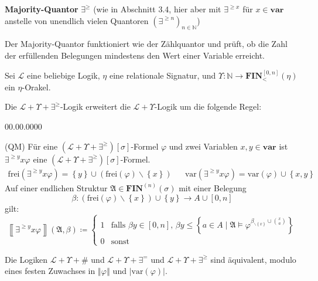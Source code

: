 %
\begin{defn}
\textbf{Majority-Quantor }$\exists^{\geqslant}$ (wie in \cite{EbbinghausFlum}
Abschnitt 3.4, hier aber mit $\exists^{\geqslant x}$ für $x\in\mathbf{var}$
anstelle von unendlich vielen Quantoren $\left(\exists^{\geqslant n}\right)_{n\in\mathbb{N}}$)

Der Majority-Quantor funktioniert wie der Zählquantor und prüft, ob
die Zahl der erfüllenden Belegungen mindestens den Wert einer Variable
erreicht.

Sei $\mathcal{L}$ eine beliebige Logik, $\eta$ eine relationale
Signatur, und $\Upsilon:\mathbb{N}\rightarrow\mathbf{FIN}_{<}^{\left[0,n\right]}\left(\eta\right)$
ein $\eta$-Orakel.

Die $\mathcal{L}+\Upsilon+\exists^{\geqslant}$-Logik erweitert die
$\mathcal{L}+\Upsilon$-Logik um die folgende Regel:

\begin{labeling}{00.00.0000}
\item [{(QM)}] Für eine $\left(\mathcal{L}+\Upsilon+\exists^{\geqslant}\right)\left[\sigma\right]$-Formel
$\varphi$ und zwei Variablen $x,y\in\mathbf{var}$ ist $\exists^{\geqslant y}x\varphi$
eine $\left(\mathcal{L}+\Upsilon+\exists^{\geqslant}\right)\left[\sigma\right]$-Formel.
\begin{eqnarray*}
\mathrm{frei}\left(\exists^{\geqslant y}x\varphi\right)=\left\{ y\right\} \cup\left(\mathrm{frei}\left(\varphi\right)\backslash\left\{ x\right\} \right) &  & \mathrm{var}\left(\exists^{\geqslant y}x\varphi\right)=\mathrm{var}\left(\varphi\right)\cup\left\{ x,y\right\} 
\end{eqnarray*}
Auf einer endlichen Struktur $\mathfrak{A}\in\mathbf{FIN}^{\left(n\right)}\left(\sigma\right)$
mit einer Belegung 
\[
\beta:\left(\mathrm{frei}\left(\varphi\right)\backslash\left\{ x\right\} \right)\cup\left\{ y\right\} \rightarrow A\cup\left[0,n\right]
\]
 gilt: 
\[
\left\llbracket \exists^{\geqslant y}x\varphi\right\rrbracket \left(\mathfrak{A},\beta\right)\coloneqq\begin{cases}
1 & \mathrm{falls}\,\,\beta y\in\left[0,n\right],\,\beta y\leqslant\left\{ a\in A\mid\mathfrak{A}\models\varphi^{\beta_{\backslash\left\{ x\right\} }\cup\binom{x}{a}}\right\} \\
0 & \mathrm{sonst}
\end{cases}
\]
\end{labeling}
\end{defn}
\begin{prop}
\label{prop:counting-equal}Die Logiken $\mathcal{L}+\Upsilon+\#$
und $\mathcal{L}+\Upsilon+\exists^{=}$ und $\mathcal{L}+\Upsilon+\exists^{\geqslant}$
sind äquivalent, modulo eines festen Zuwachses in $\left\Vert \varphi\right\Vert $
und $\left|\mathrm{var}\left(\varphi\right)\right|$.
\end{prop}
